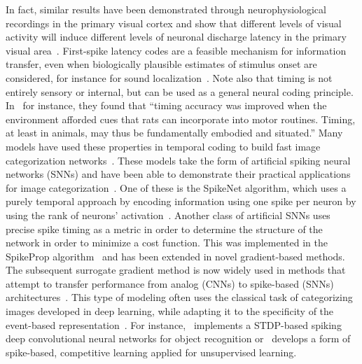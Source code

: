 \documentclass[brainsci, %
               review,submit,pdftex,moreauthors
               ]{Definitions/mdpi}
\newcommand{\note}[1]{{\sethlcolor{yellow}\hl{#1}}}
\begin{document}
In fact, similar results have been demonstrated through neurophysiological recordings in the primary visual cortex and show that different levels of visual activity will induce different levels of neuronal discharge latency in the primary visual area~\citep{celebrini_dynamics_1993}. First-spike latency codes are a feasible mechanism for information transfer, even when biologically plausible estimates of stimulus onset are considered, for instance for sound localization~\citep{chase_first-spike_2007}.  Note also that timing is not entirely sensory or internal, but can be used as a general neural coding principle. In~\citep{safaie_turning_2020} for instance, they found that ``timing accuracy was improved when the environment afforded cues that rats can incorporate into motor routines. Timing, at least in animals, may thus be fundamentally embodied and situated.''  Many models have used these properties in temporal coding to build fast image categorization networks~\citep{gautrais_rate_1998,delorme_spikenet_1999, perrinet_coding_2004}. These models take the form of artificial spiking neural networks (SNNs) and have been able to demonstrate their practical applications for image categorization~\citep{delorme_ultra-rapid_2000}. One of these is the SpikeNet algorithm, which uses a purely temporal approach by encoding information using one spike per neuron by using the rank of neurons' activation~\citep{delorme_spikenet_1999,bonilla_analyzing_2022}. Another class of artificial SNNs uses precise spike timing as a metric in order to determine the structure of the network in order to minimize a cost function. This was implemented in the SpikeProp algorithm~\citep{bohte_error-backpropagation_2002} and has been extended in novel gradient-based methods. The subsequent surrogate gradient method is now widely used in methods that attempt to transfer performance from analog (CNNs) to spike-based (SNNs) architectures~\citep{zenke_remarkable_2021}. This type of modeling often uses the classical task of categorizing images developed in deep learning, while adapting it to the specificity of the event-based representation~\citep{goltz_fast_2021}. For instance,~\citep{kheradpisheh_stdp-based_2018} implements a STDP-based spiking deep convolutional neural networks for object recognition or~\citep{tavanaei_representation_2018} develops a form of spike-based, competitive learning applied for unsupervised learning. 
\end{document}
